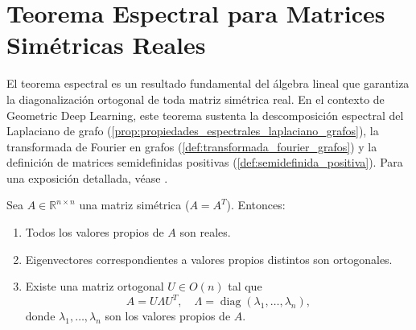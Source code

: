 
\section{Teorema Espectral para Matrices Simétricas Reales}\label{sec:teorema_espectral}

El teorema espectral es un resultado fundamental del álgebra lineal que garantiza la diagonalización ortogonal de toda matriz simétrica real. En el contexto de Geometric Deep Learning, este teorema sustenta la descomposición espectral del Laplaciano de grafo (\autoref{prop:propiedades_espectrales_laplaciano_grafos}), la transformada de Fourier en grafos (\autoref{def:transformada_fourier_grafos}) y la definición de matrices semidefinidas positivas (\autoref{def:semidefinida_positiva}). Para una exposición detallada, véase \citet[Cap.~7]{Axler2015}.

\begin{theorem}\label{thm:espectral_matrices_simetricas}
	Sea $A \in \mathbb{R}^{n \times n}$ una matriz simétrica ($A = A^T$). Entonces:
	\begin{enumerate}
		\item Todos los valores propios de $A$ son reales.
		\item Eigenvectores correspondientes a valores propios distintos son ortogonales.
		\item Existe una matriz ortogonal $U \in O(n)$ tal que
		\[
			A = U \Lambda U^T, \quad \Lambda = \operatorname{diag}(\lambda_1, \ldots, \lambda_n),
		\]
		donde $\lambda_1, \ldots, \lambda_n$ son los valores propios de $A$.
	\end{enumerate}
\end{theorem}

